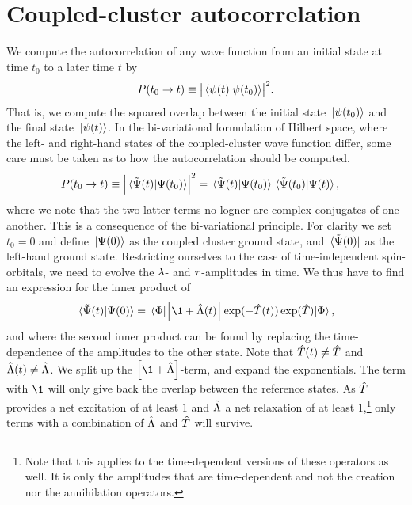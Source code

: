 \chapter{Coupled-cluster autocorrelation}
    \label{app:cc-autocorrelation}
    We compute the autocorrelation of any wave function from an initial state at
    time $t_0$ to a later time $t$ by
    \begin{align}
        P(t_0 \to t)
        \equiv \abs{\braket*{\psi(t)}{\psi(t_0)}}^2.
    \end{align}
    That is, we compute the squared overlap between the initial state
    $\ket*{\psi(t_0)}$ and the final state $\ket*{\psi(t)}$.
    In the bi-variational formulation of Hilbert space, where the left- and
    right-hand states of the coupled-cluster wave function differ, some care
    must be taken as to how the autocorrelation should be computed.
    \begin{align}
        P(t_0 \to t)
        &\equiv \abs{\braket*{\tilde{\Psi}(t)}{\Psi(t_0)}}^2
        = \braket*{\tilde{\Psi}(t)}{\Psi(t_0)}
        \braket*{\tilde{\Psi}(t_0)}{\Psi(t)},
    \end{align}
    where we note that the two latter terms no logner are complex conjugates of
    one another.
    This is a consequence of the bi-variational principle.
    For clarity we set $t_0 = 0$ and define $\ket*{\Psi(0)}$ as the coupled
    cluster ground state, and $\bra*{\tilde{\Psi}(0)}$ as the left-hand ground
    state.
    Restricting ourselves to the case of time-independent spin-orbitals, we need
    to evolve the $\lambda$- and $\tau$-amplitudes in time.
    We thus have to find an expression for the inner product of
    \begin{gather}
        \braket*{\tilde{\Psi}(t)}{\Psi(0)}
        =
        \mel*{\slat}{
            \brak{\1 + \clustl(t)}
            \exponential(-\clust(t))
            \exponential(\clust)
        }{\slat},
    \end{gather}
    and where the second inner product can be found by replacing the
    time-dependence of the amplitudes to the other state.
    Note that $\hat{T}(t) \neq \hat{T}$ and $\hat{\Lambda}(t) \neq \hat{\Lambda}$.
    We split up the $\brak{\1 + \clustl}$-term, and expand the exponentials.
    The term with $\1$ will only give back the overlap between the reference
    states.
    As $\hat{T}$ provides a net excitation of at least $1$ and $\hat{\Lambda}$ a net
    relaxation of at least $1$,\footnote{
        Note that this applies to the time-dependent versions
        of these operators as well. It is only the amplitudes that are
        time-dependent and not the creation nor the annihilation operators.
    } only terms with a combination of $\hat{\Lambda}$ and $\hat{T}$ will survive.
